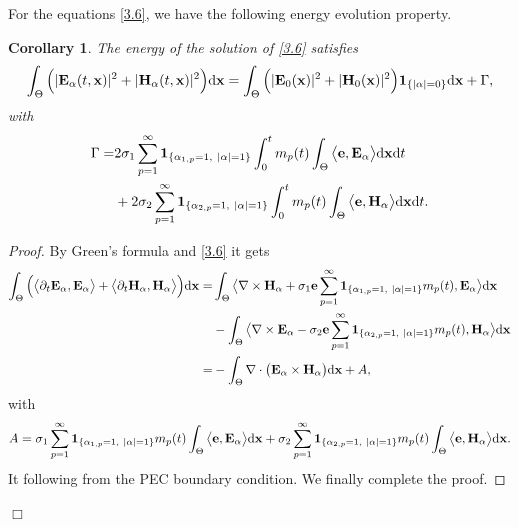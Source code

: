 \documentclass[preprint,12pt]{article}
\newtheorem{proof}{Proof}
\newtheorem{cor}{Corollary}
\numberwithin{figure}{section}
\numberwithin{table}{section}
\numberwithin{equation}{section}
\begin{document}
For the equations \eqref{3.6}, we have the following energy evolution property.
\begin{cor}
The energy of the solution of \eqref{3.6} satisfies
$$
\int_\Theta\Big(|{\bf E}_\alpha(t,{\bf x})|^2+|{\bf H}_\alpha(t,{\bf x})|^2\Big){\rm d}{\bf x}=\int_\Theta\Big(|{\bf E}_0({\bf x})|^2+|{\bf H}_0({\bf x})|^2\Big){\bf 1}_{\{|\alpha|=0\}}{\rm d}{\bf x}+\Gamma,
$$
with
\begin{equation*}
	\begin{split}
		\Gamma=&2\sigma_{1}\sum_{p=1}^{\infty}{\bf 1}_{\{\alpha_{1,p}=1,~|\alpha|=1\}}\int_0^tm_p(t)\int_\Theta \big\langle{\bf{e}},{\bf E}_\alpha\big\rangle{\rm d}{\bf x}{\rm d}t\\
		&+2\sigma_{2}\sum_{p=1}^{\infty}{\bf 1}_{\{\alpha_{2,p}=1,~|\alpha|=1\}}\int_{0}^tm_p(t)\int_\Theta \big\langle{\bf{e}},{\bf H}_\alpha\big\rangle{\rm d}{\bf x}{\rm d}t.
	\end{split}
\end{equation*}
\end{cor}
\begin{proof}
By Green’s formula and \eqref{3.6} it gets
\begin{equation}\label{3.7}
	\begin{split}
		\int_\Theta\Big(\big\langle\partial_t{\bf E}_\alpha,{\bf E}_\alpha\big\rangle+\big\langle\partial_t{\bf H}_\alpha,{\bf H}_\alpha\big\rangle\Big){\rm d}{\bf x}=&\int_\Theta\big\langle\nabla\times{\bf H}_\alpha+\sigma_{1}{\bf{e}}\sum_{p=1}^{\infty}{\bf 1}_{\{\alpha_{1,p}=1,~|\alpha|=1\}}m_p(t),{\bf E}_\alpha\big\rangle{\rm d}{\bf x}\\
		&-\int_\Theta\big\langle\nabla\times{\bf E}_\alpha-\sigma_{2}{\bf{e}}\sum_{p=1}^{\infty}{\bf 1}_{\{\alpha_{2,p}=1,~|\alpha|=1\}}m_p(t),{\bf H}_\alpha\big\rangle{\rm d}{\bf x}\\
		=&-\int_\Theta\nabla\cdot\big({\bf E}_\alpha\times{\bf H}_\alpha\big){\rm d}{\bf x}+A,
	\end{split}	
\end{equation}
with 
$$A=\sigma_{1}\sum_{p=1}^{\infty}{\bf 1}_{\{\alpha_{1,p}=1,~|\alpha|=1\}}m_p(t)\int_\Theta\big\langle{\bf{e}},{\bf E}_\alpha\big\rangle{\rm d}{\bf x}+\sigma_{2}\sum_{p=1}^{\infty}{\bf 1}_{\{\alpha_{2,p}=1,~|\alpha|=1\}}m_p(t)\int_\Theta\big\langle{\bf{e}},{\bf H}_\alpha\big\rangle{\rm d}{\bf x}.$$
It following from the PEC boundary condition. We finally complete the proof.
\end{proof}
\hfill $\Box$
\end{document}
